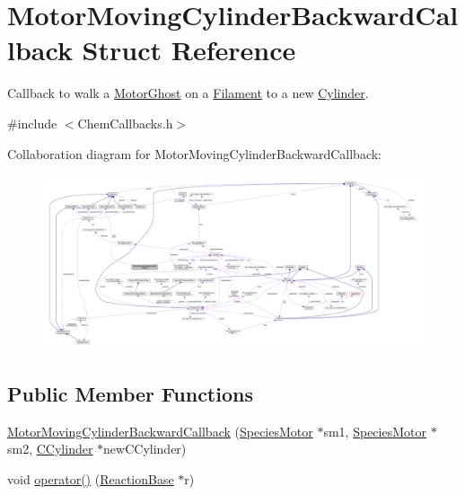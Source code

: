 \hypertarget{structMotorMovingCylinderBackwardCallback}{\section{Motor\+Moving\+Cylinder\+Backward\+Callback Struct Reference}
\label{structMotorMovingCylinderBackwardCallback}
}


Callback to walk a \hyperlink{classMotorGhost}{Motor\+Ghost} on a \hyperlink{classFilament}{Filament} to a new \hyperlink{classCylinder}{Cylinder}.  




{\ttfamily \#include $<$Chem\+Callbacks.\+h$>$}



Collaboration diagram for Motor\+Moving\+Cylinder\+Backward\+Callback\+:\nopagebreak
\begin{figure}[H]
\begin{center}
\leavevmode
\includegraphics[width=350pt]{structMotorMovingCylinderBackwardCallback__coll__graph}
\end{center}
\end{figure}
\subsection*{Public Member Functions}
\begin{DoxyCompactItemize}
\item 
\hyperlink{structMotorMovingCylinderBackwardCallback_affc37b3fcfb9c4274784e42d6d74b31a}{Motor\+Moving\+Cylinder\+Backward\+Callback} (\hyperlink{classSpeciesMotor}{Species\+Motor} $\ast$sm1, \hyperlink{classSpeciesMotor}{Species\+Motor} $\ast$sm2, \hyperlink{classCCylinder}{C\+Cylinder} $\ast$new\+C\+Cylinder)
\item 
void \hyperlink{structMotorMovingCylinderBackwardCallback_ab157006ae9fc4b8ccf4a30ddbf042f6e}{operator()} (\hyperlink{classReactionBase}{Reaction\+Base} $\ast$r)
\end{DoxyCompactItemize}
